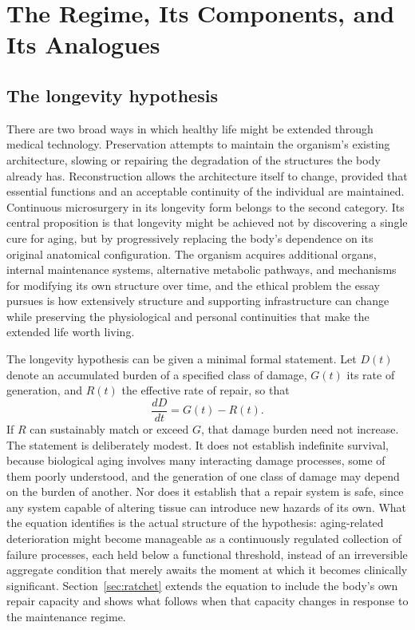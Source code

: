 \documentclass[11pt]{article}
\theoremstyle{plain}
\theoremstyle{definition}
\theoremstyle{remark}
\begin{document}
\section{The Regime, Its Components, and Its Analogues}\label{sec:analogues}

\subsection{The longevity hypothesis}

There are two broad ways in which healthy life might be extended through medical technology. Preservation attempts to maintain the organism's existing architecture, slowing or repairing the degradation of the structures the body already has. Reconstruction allows the architecture itself to change, provided that essential functions and an acceptable continuity of the individual are maintained. Continuous microsurgery in its longevity form belongs to the second category. Its central proposition is that longevity might be achieved not by discovering a single cure for aging, but by progressively replacing the body's dependence on its original anatomical configuration. The organism acquires additional organs, internal maintenance systems, alternative metabolic pathways, and mechanisms for modifying its own structure over time, and the ethical problem the essay pursues is how extensively structure and supporting infrastructure can change while preserving the physiological and personal continuities that make the extended life worth living.

The longevity hypothesis can be given a minimal formal statement. Let $D(t)$ denote an accumulated burden of a specified class of damage, $G(t)$ its rate of generation, and $R(t)$ the effective rate of repair, so that
\[
\frac{dD}{dt}=G(t)-R(t).
\]
If $R$ can sustainably match or exceed $G$, that damage burden need not increase. The statement is deliberately modest. It does not establish indefinite survival, because biological aging involves many interacting damage processes, some of them poorly understood, and the generation of one class of damage may depend on the burden of another. Nor does it establish that a repair system is safe, since any system capable of altering tissue can introduce new hazards of its own. What the equation identifies is the actual structure of the hypothesis: aging-related deterioration might become manageable as a continuously regulated collection of failure processes, each held below a functional threshold, instead of an irreversible aggregate condition that merely awaits the moment at which it becomes clinically significant. Section~\ref{sec:ratchet} extends the equation to include the body's own repair capacity and shows what follows when that capacity changes in response to the maintenance regime.
\end{document}
